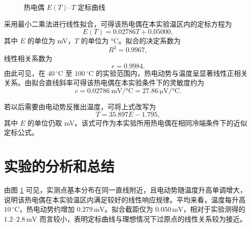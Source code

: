 \documentclass{../template/myrpt}
\begin{document}
\begin{figure}[htbp]
  \centering
  \caption{热电偶 $E(T)$--$T$ 定标曲线}
  \label{fig:calibration}
\end{figure}

采用最小二乘法进行线性拟合，可得该热电偶在本实验温区内的定标方程为
\[
  E(T) = 0.02786T + 0.05000,
\]
其中 $E$ 的单位为 \si{\milli\volt}，$T$ 的单位为 \si{\celsius}。拟合的决定系数为
\[
  R^2 = 0.9967,
\]
线性相关系数为
\[
  r = 0.9984.
\]
由此可见，在 $40\,^{\circ}\mathrm{C}$ 至 $100\,^{\circ}\mathrm{C}$ 的实验范围内，热电动势与温度呈显著线性正相关关系。由拟合直线斜率可得该热电偶在本实验条件下的灵敏度约为
\[
  c = 0.02786\ \si{\milli\volt\per\celsius}
  = 27.86\ \si{\micro\volt\per\celsius}.
\]

若以后需要由电动势反推出温度，可将上式改写为
\[
  T = 35.897E - 1.795,
\]
其中 $E$ 的单位仍取 \si{\milli\volt}。该式可作为本实验所用热电偶在相同冷端条件下的近似定标公式。

\section{实验的分析和总结}

由图 \ref{fig:calibration} 可见，实测点基本分布在同一直线附近，且电动势随温度升高单调增大，说明该热电偶在本实验温区内满足较好的线性响应规律。平均来看，温度每升高 $10\,^{\circ}\mathrm{C}$，热电动势约增加 $0.279\,\si{\milli\volt}$。拟合截距仅为 $0.050\,\si{\milli\volt}$，相对于实验测得的 $1.2$--$2.8\,\si{\milli\volt}$ 而言较小，表明定标曲线与理想情况下过原点的线性关系较为接近。
\end{document}
